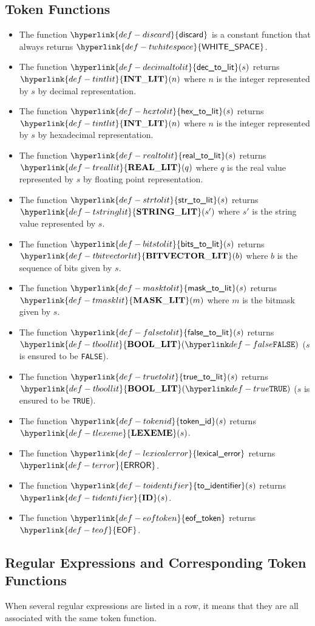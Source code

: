 \documentclass{book}
\newcommand\terminal[1]{\mathtt{\mathbf{#1}}}
\newcommand\Tidentifier[0]{\hyperlink{def-tidentifier}{\terminal{ID}}}
\newcommand\Tstringlit[0]{\hyperlink{def-tstringlit}{\terminal{STRING\_LIT}}}
\newcommand\Tmasklit[0]{\hyperlink{def-tmasklit}{\terminal{MASK\_LIT}}}
\newcommand\Tbitvectorlit[0]{\hyperlink{def-tbitvectorlit}{\terminal{BITVECTOR\_LIT}}}
\newcommand\Tintlit[0]{\hyperlink{def-tintlit}{\terminal{INT\_LIT}}}
\newcommand\Treallit[0]{\hyperlink{def-treallit}{\terminal{REAL\_LIT}}}
\newcommand\Tboollit[0]{\hyperlink{def-tboollit}{\terminal{BOOL\_LIT}}}
\newcommand\Tlexeme[0]{\hyperlink{def-tlexeme}{\terminal{LEXEME}}}
\newcommand\discard[0]{\hyperlink{def-discard}{\textsf{discard}}}
\newcommand\decimaltolit[0]{\hyperlink{def-decimaltolit}{\textsf{dec\_to\_lit}}}
\newcommand\hextolit[0]{\hyperlink{def-hextolit}{\textsf{hex\_to\_lit}}}
\newcommand\realtolit[0]{\hyperlink{def-realtolit}{\textsf{real\_to\_lit}}}
\newcommand\strtolit[0]{\hyperlink{def-strtolit}{\textsf{str\_to\_lit}}}
\newcommand\bitstolit[0]{\hyperlink{def-bitstolit}{\textsf{bits\_to\_lit}}}
\newcommand\masktolit[0]{\hyperlink{def-masktolit}{\textsf{mask\_to\_lit}}}
\newcommand\truetolit[0]{\hyperlink{def-truetolit}{\textsf{true\_to\_lit}}}
\newcommand\falsetolit[0]{\hyperlink{def-falsetolit}{\textsf{false\_to\_lit}}}
\newcommand\tokenid[0]{\hyperlink{def-tokenid}{\textsf{token\_id}}}
\newcommand\lexicalerror[0]{\hyperlink{def-lexicalerror}{\textsf{lexical\_error}}}
\newcommand\toidentifier[0]{\hyperlink{def-toidentifier}{\textsf{to\_identifier}}}
\newcommand\eoftoken[0]{\hyperlink{def-eoftoken}{\textsf{eof\_token}}}
\newcommand\Teof[0]{\hyperlink{def-teof}{\textsf{EOF}}}
\newcommand\Terror[0]{\hyperlink{def-terror}{\textsf{ERROR}}}
\newcommand\Twhitespace[0]{\hyperlink{def-twhitespace}{\textsf{WHITE\_SPACE}}}
\begin{document}
\subsection{Token Functions}
\hypertarget{def-discard}{}
\begin{itemize}
\item The function $\discard$ is a constant function that always returns $\Twhitespace$.
\hypertarget{def-decimaltolit}{}
\item The function $\decimaltolit(s)$ returns $\Tintlit(n)$ where $n$ is the integer represented by $s$
by decimal representation.
\hypertarget{def-hextolit}{}
\item The function $\hextolit(s)$ returns $\Tintlit(n)$ where $n$ is the integer represented by $s$
by hexadecimal representation.
\hypertarget{def-realtolit}{}
\item The function $\realtolit(s)$ returns $\Treallit(q)$ where $q$ is the real value represented by $s$
by floating point representation.
\hypertarget{def-strtolit}{}
\item The function $\strtolit(s)$ returns $\Tstringlit(s')$ where $s'$ is the string value represented by $s$.
\hypertarget{def-bitstolit}{}
\item The function $\bitstolit(s)$ returns $\Tbitvectorlit(b)$ where $b$ is the sequence of bits
given by $s$.
\hypertarget{def-masktolit}{}
\item The function $\masktolit(s)$ returns $\Tmasklit(m)$ where $m$ is the bitmask given by $s$.
\hypertarget{def-falsetolit}{}
\item The function $\falsetolit(s)$ returns $\Tboollit(\False)$ ($s$ is ensured to be \texttt{FALSE}).
\hypertarget{def-truetolit}{}
\item The function $\truetolit(s)$ returns $\Tboollit(\True)$ ($s$ is ensured to be \texttt{TRUE}).
\hypertarget{def-tokenid}{}
\item The function $\tokenid(s)$ returns $\Tlexeme(s)$.
\hypertarget{def-lexicalerror}{}
\item The function $\lexicalerror$ returns $\Terror$.
\hypertarget{def-toidentifier}{}
\item The function $\toidentifier(s)$ returns $\Tidentifier(s)$.
\hypertarget{def-eoftoken}{}
\item The function $\eoftoken$ returns $\Teof$.
\end{itemize}

\subsection{Regular Expressions and Corresponding Token Functions}
When several regular expressions are listed in a row, it means that they are all associated with the same
token function.
\end{document}
